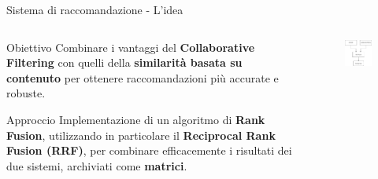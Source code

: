 \documentclass{beamer}
\begin{document}
	\begin{frame}{Sistema di raccomandazione - L'idea}
		\begin{columns}
			\begin{column}{0.6\textwidth}
				\begin{alertblock}{Obiettivo}
					Combinare i vantaggi del \textbf{Collaborative Filtering} con quelli della \textbf{similarità basata su contenuto} per ottenere raccomandazioni più accurate e robuste.
				\end{alertblock}

				\begin{exampleblock}{Approccio}
					Implementazione di un algoritmo di \textbf{Rank Fusion}, utilizzando in particolare il \textbf{Reciprocal Rank Fusion (RRF)}, per combinare efficacemente i risultati dei due sistemi, archiviati come \textbf{matrici}.
				\end{exampleblock}
			\end{column}
			\begin{column}{0.4\textwidth}
				\begin{figure}
					\centering
					\includegraphics[width=\textwidth]{Diagramma Pipeline sistema di raccomandazione.png}
				\end{figure}
			\end{column}
		\end{columns}
	\end{frame}
\end{document}
